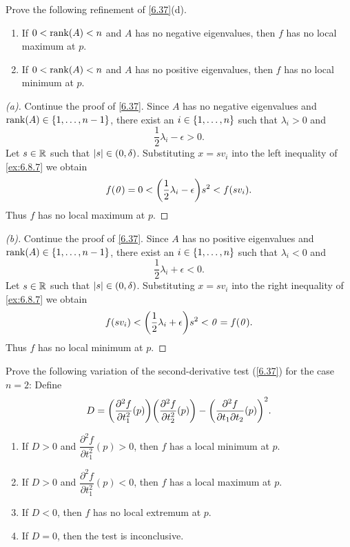 \setcounter{ex}{18}
\begin{ex}\label{ex:6.8.19}
  Prove the following refinement of \cref{6.37}(d).
  \begin{enumerate}
    \item If \(0 < \rk{A} < n\) and \(A\) has no negative eigenvalues, then \(f\) has no local maximum at \(p\).
    \item If \(0 < \rk{A} < n\) and \(A\) has no positive eigenvalues, then \(f\) has no local minimum at \(p\).
  \end{enumerate}
\end{ex}

\begin{proof}[(a)]
  Continue the proof of \cref{6.37}.
  Since \(A\) has no negative eigenvalues and \(\rk{A} \in \set{1, \dots, n - 1}\), there exist an \(i \in \left\lbrace1, \dots, n\right\rbrace\) such that \(\lambda_i > 0\) and
  \[
    \dfrac{1}{2} \lambda_i - \epsilon > 0.
  \]
  Let \(s \in \mathbb{R}\) such that \(\left\lvert s\right\rvert \in (0, \delta)\).
  Substituting \(x = s v_i\) into the left inequality of \cref{ex:6.8.7} we obtain
  \[
    f(\zv) = 0 < \pa{\dfrac{1}{2} \lambda_i - \epsilon} s^2 < f(s v_i).
  \]
  Thus \(f\) has no local maximum at \(p\).
\end{proof}

\begin{proof}[(b)]
  Continue the proof of \cref{6.37}.
  Since \(A\) has no positive eigenvalues and \(\rk{A} \in \set{1, \dots, n - 1}\), there exist an \(i \in \left\lbrace1, \dots, n\right\rbrace\) such that \(\lambda_i < 0\) and
  \[
    \dfrac{1}{2} \lambda_i + \epsilon < 0.
  \]
  Let \(s \in \mathbb{R}\) such that \(\left\lvert s\right\rvert \in (0, \delta)\).
  Substituting \(x = s v_i\) into the right inequality of \cref{ex:6.8.7} we obtain
  \[
    f(s v_i) < \pa{\dfrac{1}{2} \lambda_i + \epsilon} s^2 < \zv = f(\zv).
  \]
  Thus \(f\) has no local minimum at \(p\).
\end{proof}

\begin{ex}\label{ex:6.8.20}
  Prove the following variation of the second-derivative test (\cref{6.37}) for the case \(n = 2\):
  Define
  \[
    D = \pa{\dfrac{\partial^2 f}{\partial t_1^2}(p)} \pa{\dfrac{\partial^2 f}{\partial t_2^2}(p)} - \pa{\dfrac{\partial^2 f}{\partial t_1 \partial t_2}(p)}^2.
  \]
  \begin{enumerate}
    \item If \(D > 0\) and \(\dfrac{\partial^2 f}{\partial t_1^2}(p) > 0\), then \(f\) has a local minimum at \(p\).
    \item If \(D > 0\) and \(\dfrac{\partial^2 f}{\partial t_1^2}(p) < 0\), then \(f\) has a local maximum at \(p\).
    \item If \(D < 0\), then \(f\) has no local extremum at \(p\).
    \item If \(D = 0\), then the test is inconclusive.
  \end{enumerate}
\end{ex}

